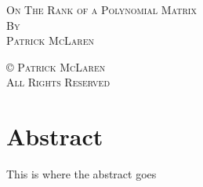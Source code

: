 \documentclass{amsart}
\theoremstyle{definition}
\theoremstyle{remark}
\numberwithin{equation}{section}
\begin{document}

\def\thetitle{On The Rank of a Polynomial Matrix}
\def\theauthor{Patrick McLaren}
\def\theemail{patrick.mclaren001@umb.edu}

\begin{titlepage}
  \begin{center}
    \textsc{\LARGE \thetitle}\\[0.75cm]
    \textsc{By}\\[0.25cm]
    \textsc{\large \theauthor}\\[1cm]
  \end{center}
\end{titlepage}


\thispagestyle{empty}

\null
\vfill

\textsc{\copyright {} Patrick McLaren \\ All Rights Reserved}

\newpage


\thispagestyle{empty}

\section*{Abstract}

\begin{center}
  \begin{minipage}{0.6\textwidth}
    \begin{flushleft}
      This is where the abstract goes
    \end{flushleft}
  \end{minipage}
\end{center}

\newpage


\setcounter{page}{1}
\end{document}

